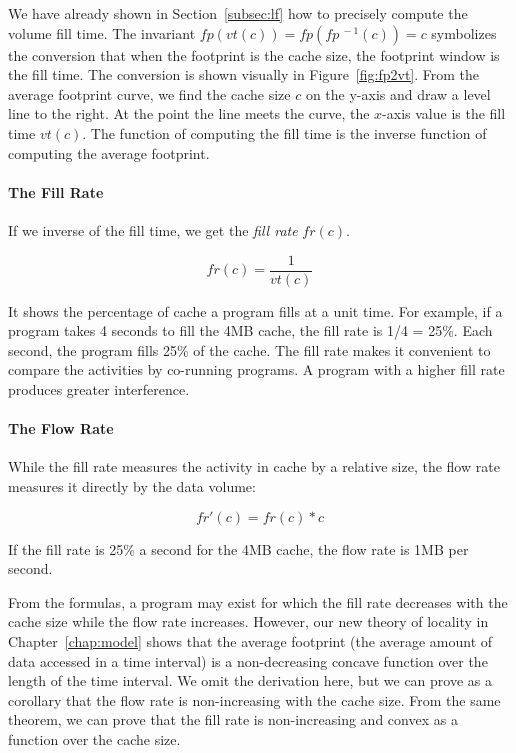 We have already shown in Section~\ref{subsec:lf} how to precisely compute
the volume fill time. The invariant $fp(vt(c)) = fp(fp^{\ -1}(c))= c$
symbolizes the conversion that when the footprint is the cache size,
the footprint window is the fill time. The conversion is shown
visually in Figure~\ref{fig:fp2vt}.  From the average footprint curve,
we find the cache size $c$ on the y-axis and draw a level line to the
right.  At the point the line meets the curve, the $x$-axis value is
the fill time $vt(c)$. The function of computing the fill time is the
inverse function of computing the average footprint.

\paragraph{The Fill Rate}
If we inverse of the fill time, we get the \emph{fill rate} $fr(c)$.  

$$fr(c) = \frac{1}{vt(c)}$$

\noindent It shows the percentage of cache a program fills at a unit
time.  For example, if a program takes 4 seconds to fill the 4MB
cache, the fill rate is 1/4 = 25\%.  Each second, the program fills
25\% of the cache.  The fill rate makes it convenient to compare the activities by co-running programs.  A program with a higher
fill rate produces greater interference.  

\paragraph{The Flow Rate}
While the fill rate measures the activity in cache by a relative size,
the flow rate measures it directly by the data volume:

$$fr'(c) = fr(c) * c$$

\noindent If the fill rate is 25\% a second for the 4MB cache, the
flow rate is 1MB per second.  

\bigskip 

From the formulas, a program may exist for which the fill rate
decreases with the cache size while the flow rate increases.  However,
our new theory of locality in Chapter~\ref{chap:model} shows that the
average footprint (the average amount of data accessed in a time
interval) is a non-decreasing concave function over the length of the
time interval.  We omit the derivation here, but we can prove as a
corollary that the flow rate is non-increasing with the cache size.
From the same theorem, we can prove that the fill rate is
non-increasing and convex as a function over the cache size. 

